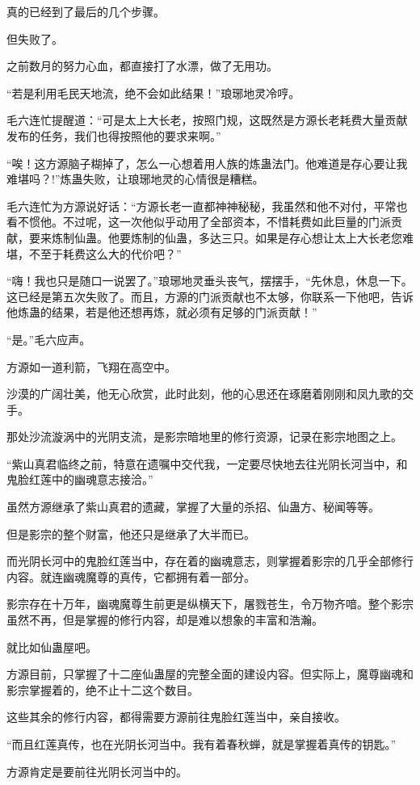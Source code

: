 \begin{this_body}
真的已经到了最后的几个步骤。

但失败了。

之前数月的努力心血，都直接打了水漂，做了无用功。

“若是利用毛民天地流，绝不会如此结果！”琅琊地灵冷哼。

毛六连忙提醒道：“可是太上大长老，按照门规，这既然是方源长老耗费大量贡献发布的任务，我们也得按照他的要求来啊。”

“唉！这方源脑子糊掉了，怎么一心想着用人族的炼蛊法门。他难道是存心要让我难堪吗？!”炼蛊失败，让琅琊地灵的心情很是糟糕。

毛六连忙为方源说好话：“方源长老一直都神神秘秘，我虽然和他不对付，平常也看不惯他。不过呢，这一次他似乎动用了全部资本，不惜耗费如此巨量的门派贡献，要来炼制仙蛊。他要炼制的仙蛊，多达三只。如果是存心想让太上大长老您难堪，不至于耗费这么大的代价吧？”

“嗨！我也只是随口一说罢了。”琅琊地灵垂头丧气，摆摆手，“先休息，休息一下。这已经是第五次失败了。而且，方源的门派贡献也不太够，你联系一下他吧，告诉他炼蛊的结果，若是他还想再炼，就必须有足够的门派贡献！”

“是。”毛六应声。

方源如一道利箭，飞翔在高空中。

沙漠的广阔壮美，他无心欣赏，此时此刻，他的心思还在琢磨着刚刚和凤九歌的交手。

那处沙流漩涡中的光阴支流，是影宗暗地里的修行资源，记录在影宗地图之上。

“紫山真君临终之前，特意在遗嘱中交代我，一定要尽快地去往光阴长河当中，和鬼脸红莲中的幽魂意志接洽。”

虽然方源继承了紫山真君的遗藏，掌握了大量的杀招、仙蛊方、秘闻等等。

但是影宗的整个财富，他还只是继承了大半而已。

而光阴长河中的鬼脸红莲当中，存在着的幽魂意志，则掌握着影宗的几乎全部修行内容。就连幽魂魔尊的真传，它都拥有着一部分。

影宗存在十万年，幽魂魔尊生前更是纵横天下，屠戮苍生，令万物齐喑。整个影宗虽然不再，但是掌握的修行内容，却是难以想象的丰富和浩瀚。

就比如仙蛊屋吧。

方源目前，只掌握了十二座仙蛊屋的完整全面的建设内容。但实际上，魔尊幽魂和影宗掌握着的，绝不止十二这个数目。

这些其余的修行内容，都得需要方源前往鬼脸红莲当中，亲自接收。

“而且红莲真传，也在光阴长河当中。我有着春秋蝉，就是掌握着真传的钥匙。”

方源肯定是要前往光阴长河当中的。


\end{this_body}

